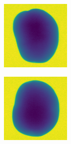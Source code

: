 \documentclass[11pt]{article}
\begin{document}
\begin{figure}[!h]
\begin{subfigure}[b]{0.22\textwidth}
         \caption{}
         \label{fig:perfect_37}
     \end{subfigure}
     \hfill
     \begin{subfigure}[b]{0.22\textwidth}
         \centering
         \includegraphics[width=\textwidth]{figurer/potato_dataset/perfect/perfect_38.jpg}
         \caption{}
         \label{fig:perfect_38}
     \end{subfigure}
     \hfill
     \begin{subfigure}[b]{0.22\textwidth}
         \centering
         \includegraphics[width=\textwidth]{figurer/potato_dataset/perfect/perfect_39.jpg}

\end{subfigure}
\end{figure}
\end{document}
